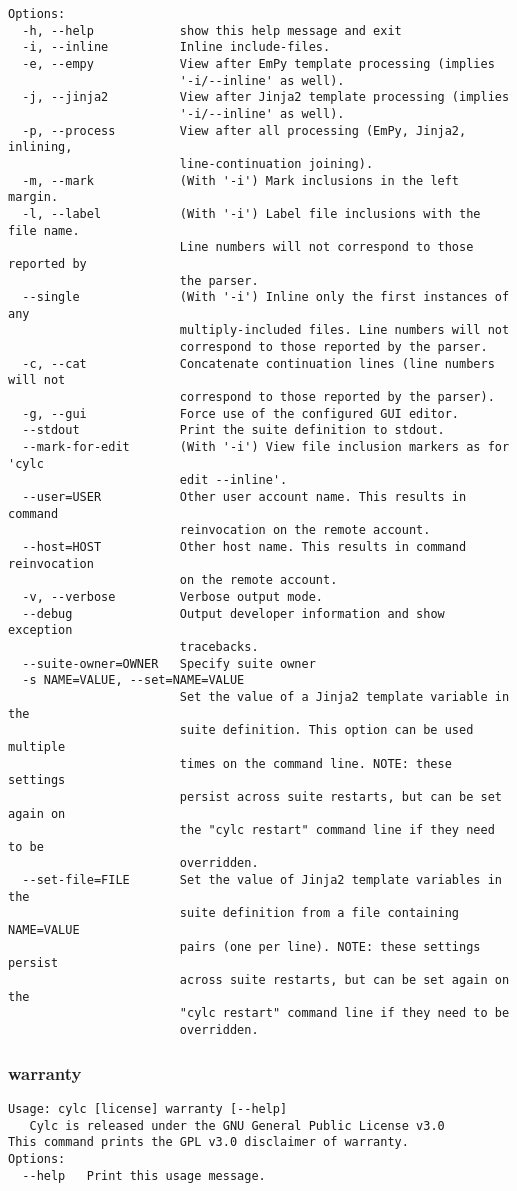 \begin{lstlisting}
Options:
  -h, --help            show this help message and exit
  -i, --inline          Inline include-files.
  -e, --empy            View after EmPy template processing (implies
                        '-i/--inline' as well).
  -j, --jinja2          View after Jinja2 template processing (implies
                        '-i/--inline' as well).
  -p, --process         View after all processing (EmPy, Jinja2, inlining,
                        line-continuation joining).
  -m, --mark            (With '-i') Mark inclusions in the left margin.
  -l, --label           (With '-i') Label file inclusions with the file name.
                        Line numbers will not correspond to those reported by
                        the parser.
  --single              (With '-i') Inline only the first instances of any
                        multiply-included files. Line numbers will not
                        correspond to those reported by the parser.
  -c, --cat             Concatenate continuation lines (line numbers will not
                        correspond to those reported by the parser).
  -g, --gui             Force use of the configured GUI editor.
  --stdout              Print the suite definition to stdout.
  --mark-for-edit       (With '-i') View file inclusion markers as for 'cylc
                        edit --inline'.
  --user=USER           Other user account name. This results in command
                        reinvocation on the remote account.
  --host=HOST           Other host name. This results in command reinvocation
                        on the remote account.
  -v, --verbose         Verbose output mode.
  --debug               Output developer information and show exception
                        tracebacks.
  --suite-owner=OWNER   Specify suite owner
  -s NAME=VALUE, --set=NAME=VALUE
                        Set the value of a Jinja2 template variable in the
                        suite definition. This option can be used multiple
                        times on the command line. NOTE: these settings
                        persist across suite restarts, but can be set again on
                        the "cylc restart" command line if they need to be
                        overridden.
  --set-file=FILE       Set the value of Jinja2 template variables in the
                        suite definition from a file containing NAME=VALUE
                        pairs (one per line). NOTE: these settings persist
                        across suite restarts, but can be set again on the
                        "cylc restart" command line if they need to be
                        overridden.
\end{lstlisting}
\subsubsection{warranty}
\label{warranty}
\begin{lstlisting}
Usage: cylc [license] warranty [--help]
   Cylc is released under the GNU General Public License v3.0
This command prints the GPL v3.0 disclaimer of warranty.
Options:
  --help   Print this usage message.
\end{lstlisting}
